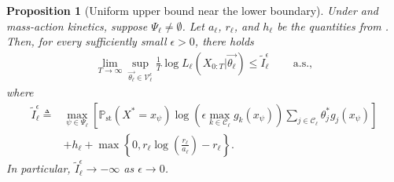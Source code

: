 \documentclass[pdflatex,sn-mathphys-num]{sn-jnl}%
\theoremstyle{thmstyleone}%
\newtheorem{proposition}[theorem]{Proposition}%
\theoremstyle{thmstyletwo}%
\theoremstyle{thmstylethree}%
\begin{document}
\begin{appendices}
\begin{proposition}[Uniform upper bound near the lower boundary]\label{proposition uniform upper bounds for the likelihood outside a region}
    Under  and mass-action kinetics, suppose $\Psi_\ell\neq\emptyset$.
    Let $a_\ell$, $r_\ell$, and $h_\ell$ be the quantities from .
    Then, for every sufficiently small $\epsilon>0$, there holds
    \begin{align*}
        \lim_{T\to\infty}
        \sup_{\overrightarrow{\theta_\ell}\in\mathcal V_\ell^\epsilon}
        \frac{1}{T}\log L_\ell\left(X_{0:T}\big|\overrightarrow{\theta_\ell}\right)
        \leq \tilde I_\ell^\epsilon
        \,\qquad \text{a.s.},
    \end{align*}
    where
    \begin{align*}
        \tilde I_\ell^\epsilon
        \triangleq
        &\max_{\psi\in\Psi_\ell}
        \left[
        \mathbb P_\text{st}\left(X^*=x_\psi\right)
        \log\left(\epsilon\max_{k\in\mathcal C_\ell}g_k(x_\psi)\right)
        \sum_{j\in\mathcal C_\ell}\theta_j^*g_j(x_\psi)
        \right]\\
        &+h_\ell
        +\max\left\{0,
        r_\ell\log\left(\frac{r_\ell}{a_\ell}\right)-r_\ell
        \right\}.
    \end{align*}
    In particular, $\tilde I_\ell^\epsilon\to -\infty$ as $\epsilon\to0$.
\end{proposition}


\end{appendices}
\end{document}
